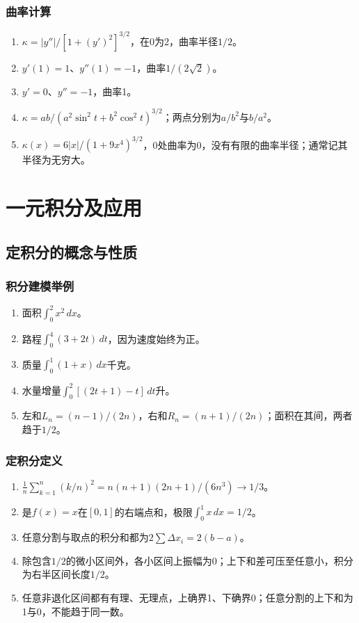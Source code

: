 \documentclass[11pt,a4paper,fontset=fandol]{ctexrep}
\begin{document}
\subsection{曲率计算}
\begin{enumerate}
\item $\kappa=|y''|/[1+(y')^2]^{3/2}$，在0为2，曲率半径$1/2$。
\item $y'(1)=1$、$y''(1)=-1$，曲率$1/(2\sqrt2)$。
\item $y'=0$、$y''=-1$，曲率1。
\item $\kappa=ab/(a^2\sin^2t+b^2\cos^2t)^{3/2}$；两点分别为$a/b^2$与$b/a^2$。
\item $\kappa(x)=6|x|/(1+9x^4)^{3/2}$，0处曲率为0，没有有限的曲率半径；通常记其半径为无穷大。
\end{enumerate}
\chapter{一元积分及应用}
\section{定积分的概念与性质}
\subsection{积分建模举例}
\begin{enumerate}
\item 面积$\int_0^2x^2\,dx$。
\item 路程$\int_0^4(3+2t)\,dt$，因为速度始终为正。
\item 质量$\int_0^1(1+x)\,dx$千克。
\item 水量增量$\int_0^2[(2t+1)-t]\,dt$升。
\item 左和$L_n=(n-1)/(2n)$，右和$R_n=(n+1)/(2n)$；面积在其间，两者趋于$1/2$。
\end{enumerate}
\subsection{定积分定义}
\begin{enumerate}
\item $\frac1n\sum_{k=1}^n(k/n)^2=n(n+1)(2n+1)/(6n^3)\to1/3$。
\item 是$f(x)=x$在$[0,1]$的右端点和，极限$\int_0^1x\,dx=1/2$。
\item 任意分割与取点的积分和都为$2\sum\Delta x_i=2(b-a)$。
\item 除包含$1/2$的微小区间外，各小区间上振幅为0；上下和差可压至任意小，积分为右半区间长度$1/2$。
\item 任意非退化区间都有有理、无理点，上确界1、下确界0；任意分割的上下和为1与0，不能趋于同一数。
\end{enumerate}
\end{document}
